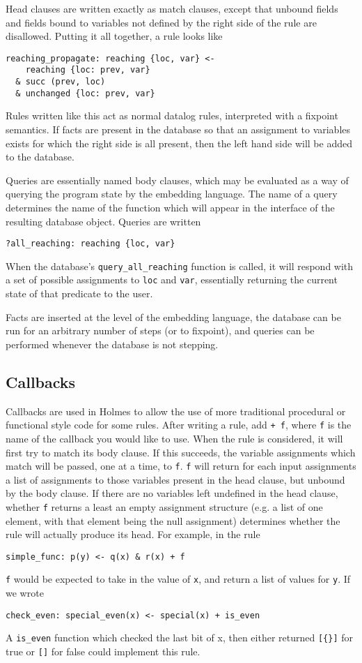Head clauses are written exactly as match clauses, except that unbound fields and fields bound to variables not defined by the right side of the rule are disallowed.
Putting it all together, a rule looks like
\begin{verbatim}
reaching_propagate: reaching {loc, var} <-
    reaching {loc: prev, var}
  & succ (prev, loc)
  & unchanged {loc: prev, var}
\end{verbatim}
Rules written like this act as normal datalog rules, interpreted with a fixpoint semantics.
If facts are present in the database so that an assignment to variables exists for which the right side is all present, then the left hand side will be added to the database.

Queries are essentially named body clauses, which may be evaluated as a way of querying the program state by the embedding language.
The name of a query determines the name of the function which will appear in the interface of the resulting database object.
Queries are written
\begin{verbatim}
?all_reaching: reaching {loc, var}
\end{verbatim}
When the database's \texttt{query\_all\_reaching} function is called, it will respond with a set of possible assignments to \texttt{loc} and \texttt{var}, essentially returning the current state of that predicate to the user.

Facts are inserted at the level of the embedding language, the database can be run for an arbitrary number of steps (or to fixpoint), and queries can be performed whenever the database is not stepping.

\subsection{Callbacks}
Callbacks are used in Holmes to allow the use of more traditional procedural or functional style code for some rules.
After writing a rule, add \texttt{+ f}, where \texttt{f} is the name of the callback you would like to use.
When the rule is considered, it will first try to match its body clause.
If this succeeds, the variable assignments which match will be passed, one at a time, to \texttt{f}.
\texttt{f} will return for each input assignments a list of assignments to those variables present in the head clause, but unbound by the body clause.
If there are no variables left undefined in the head clause, whether \texttt{f} returns a least an empty assignment structure (e.g. a list of one element, with that element being the null assignment) determines whether the rule will actually produce its head.
For example, in the rule
\begin{verbatim}
simple_func: p(y) <- q(x) & r(x) + f
\end{verbatim}
\texttt{f} would be expected to take in the value of \texttt{x}, and return a list of values for \texttt{y}.
If we wrote
\begin{verbatim}
check_even: special_even(x) <- special(x) + is_even
\end{verbatim}
A \texttt{is_even} function which checked the last bit of x, then either returned \texttt{[\{\}]} for true or \texttt{[]} for false could implement this rule.

